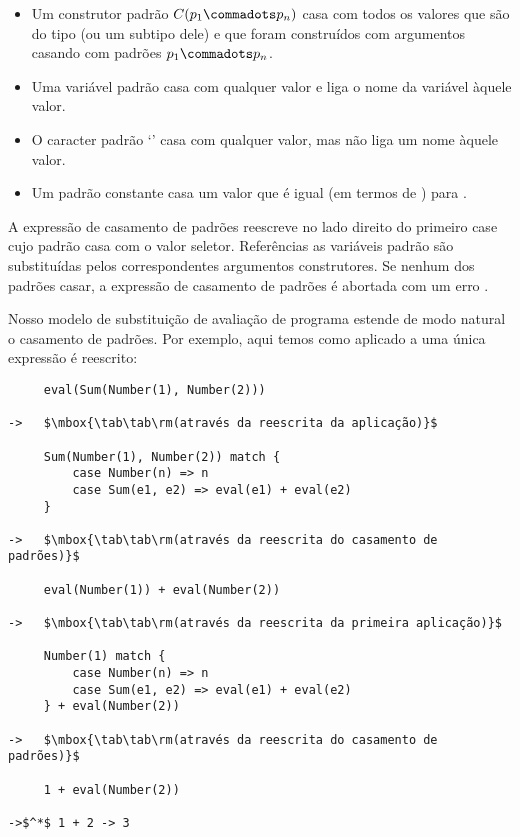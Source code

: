 \begin{itemize}
\item
Um construtor padrão $C(p_1 \commadots p_n)$ casa com todos os valores que são 
do tipo  (ou um subtipo dele) e que foram construídos com argumentos 
casando com padrões $p_1 \commadots p_n$.

\item 
Uma variável padrão  casa com qualquer valor e liga o nome da variável àquele valor.

\item 
O caracter padrão `\code{_}' casa com qualquer valor, mas não liga um nome àquele valor.

\item 
Um padrão constante  casa um valor que é igual (em termos de \code{==}) para .

\end{itemize}



A expressão de casamento de padrões reescreve no lado direito do primeiro case cujo
padrão casa com o valor seletor. Referências as variáveis padrão são substituídas pelos 
correspondentes argumentos construtores. Se nenhum dos padrões casar, a expressão 
de casamento de padrões é abortada com um erro .  


\example Nosso modelo de substituição de avaliação de programa estende de modo natural o casamento de padrões. Por exemplo, aqui temos como  aplicado a uma única expressão é reescrito:


\begin{lstlisting}
     eval(Sum(Number(1), Number(2)))

->   $\mbox{\tab\tab\rm(através da reescrita da aplicação)}$

     Sum(Number(1), Number(2)) match {
         case Number(n) => n
         case Sum(e1, e2) => eval(e1) + eval(e2)
     }

->   $\mbox{\tab\tab\rm(através da reescrita do casamento de padrões)}$

     eval(Number(1)) + eval(Number(2))

->   $\mbox{\tab\tab\rm(através da reescrita da primeira aplicação)}$

     Number(1) match {
         case Number(n) => n
         case Sum(e1, e2) => eval(e1) + eval(e2)
     } + eval(Number(2))

->   $\mbox{\tab\tab\rm(através da reescrita do casamento de padrões)}$

     1 + eval(Number(2))

->$^*$ 1 + 2 -> 3
\end{lstlisting}


